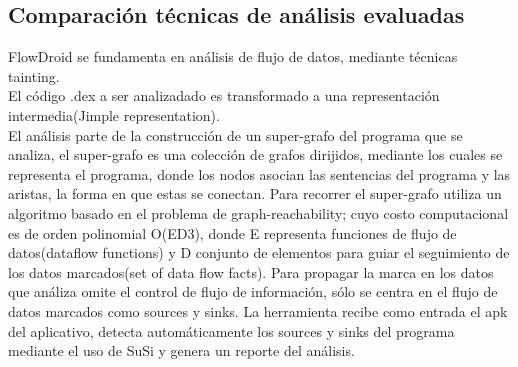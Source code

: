 \subsection{Comparación técnicas de análisis evaluadas}
FlowDroid se fundamenta en análisis de flujo de datos, mediante técnicas
tainting.\\
El código .dex a ser analizadado es transformado a una representación
intermedia(Jimple representation).\\
El análisis parte de la construcción de un super-grafo del programa que se
analiza, el super-grafo es una colección de grafos dirijidos, mediante los
cuales se representa el programa, donde los nodos asocian las sentencias del
programa y las aristas, la forma en que estas se conectan. Para recorrer el
super-grafo utiliza un algoritmo basado en el problema de
graph-reachability\cite{Graph-reachability}; cuyo costo computacional es de
orden polinomial O(ED3), donde E representa funciones de flujo de datos(dataflow
functions) y D conjunto de elementos para guiar el seguimiento de los
datos marcados(set of data flow facts).\newline
Para propagar la marca en los datos que análiza omite el control de flujo de
información, sólo se centra en el flujo de datos marcados como sources y
sinks.\newline
La herramienta recibe como entrada el apk del aplicativo, detecta
automáticamente los sources y sinks del programa mediante el uso de SuSi y
genera un reporte del análisis.

